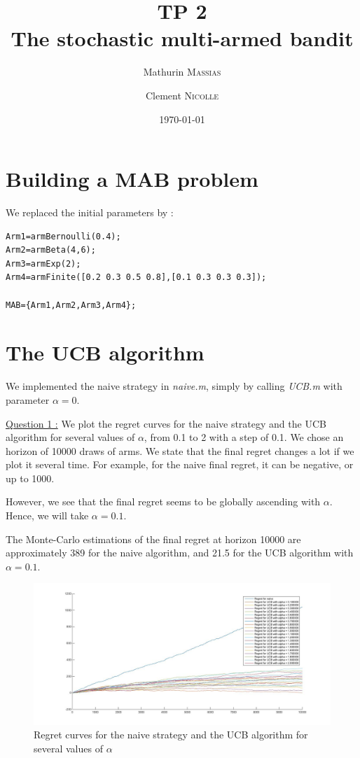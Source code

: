 \documentclass[11pt,a4paper]{article}
\title{TP 2 \\ The stochastic multi-armed bandit}
\author{Mathurin \textsc{Massias} \and Clement \textsc{Nicolle}}
\date{\today}
\begin{document}
\maketitle

\section{Building a MAB problem}
\hspace{-6mm} We replaced the initial parameters by :
\begin{verbatim}
Arm1=armBernoulli(0.4);
Arm2=armBeta(4,6);
Arm3=armExp(2);
Arm4=armFinite([0.2 0.3 0.5 0.8],[0.1 0.3 0.3 0.3]);

MAB={Arm1,Arm2,Arm3,Arm4};
\end{verbatim}

\section{The UCB algorithm}

\hspace{-6mm} We implemented the naive strategy in \textit{naive.m}, simply by calling \textit{UCB.m} with parameter $\alpha = 0$.

\underline{Question 1 :} We plot the regret curves for the naive strategy and the UCB algorithm for several values of $\alpha$, from 0.1 to 2 with a step of 0.1. We chose an horizon of 10000 draws of arms. We state that the final regret changes a lot if we plot it several time. For example, for the naive final regret, it can be negative, or up to 1000.

However, we see that the final regret seems to be globally ascending with $\alpha$. Hence, we will take $\alpha = 0.1$.

\medskip
The Monte-Carlo estimations of the final regret at horizon 10000 are approximately 389 for the naive algorithm, and 21.5 for the UCB algorithm with $\alpha = 0.1$.

\begin{figure}[H]
	\centering
	\noindent\includegraphics[scale=0.4]{regret_curves.jpg}
	\caption{Regret curves for the naive strategy and the UCB algorithm for several values of $\alpha$}
\end{figure}
\end{document}
